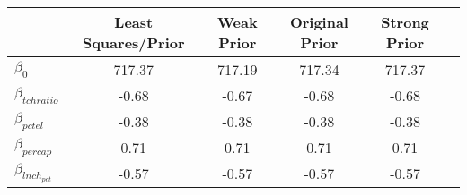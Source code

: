 \begin{tabular}{lccccc}
\toprule
 & Least Squares/Prior & Weak Prior & Original Prior & Strong Prior \\
\midrule
$\beta_0$ & 717.37 & 717.19 & 717.34 & 717.37 \\
$\beta_{tchratio}$ & -0.68 & -0.67 & -0.68 & -0.68 \\
$\beta_{pctel}$ & -0.38 & -0.38 & -0.38 & -0.38 \\
$\beta_{percap}$ & 0.71 & 0.71 & 0.71 & 0.71 \\
$\beta_{lnch_{pct}}$ & -0.57 & -0.57 & -0.57 & -0.57 \\
\bottomrule
\end{tabular}
